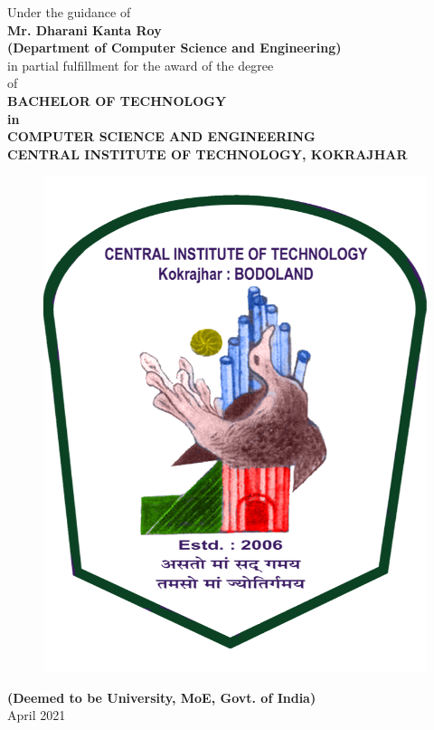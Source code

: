 \documentclass[a4paper]{article}
\begin{document}
\begin{center}
{			Under the guidance of \\\textbf{Mr. Dharani Kanta Roy}\\\textbf{(Department of Computer Science and Engineering)}\\[\baselineskip]
			in partial fulfillment for the award of the degree\\
			of\\[\baselineskip]
			\textbf{BACHELOR OF TECHNOLOGY}\\[\baselineskip]
			\textbf{in}\\[\baselineskip]
			\textbf{COMPUTER SCIENCE AND ENGINEERING}\\
			\textbf{CENTRAL INSTITUTE OF TECHNOLOGY, KOKRAJHAR}\\[\baselineskip]
			\begin{figure}[h]
				\includegraphics[scale = 0.25]{CIT_Logo.png}
				\centering
			\end{figure}
			\textbf{(Deemed to be University, MoE, Govt. of India)}\\
			April 2021
		}
	\end{center}   
\end{document}
